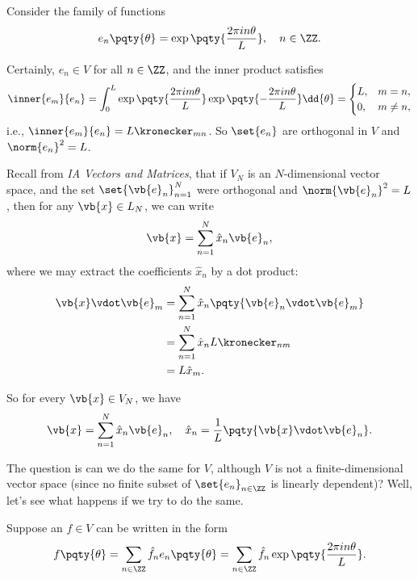 Consider the family of functions
\begin{equation}
    e_{n} \pqty{\theta} = \exp \pqty{\frac{2 \pi i n \theta}{L}}, \quad n \in \ZZ.
\end{equation}

Certainly, \(e_n \in V\) for all \(n \in \ZZ\), and the inner product satisfies
\begin{equation}
    \inner{e_m}{e_n} = \int_{0}^{L} \exp\pqty{\frac{2 \pi i m \theta}{L}} \exp\pqty{- \frac{2 \pi i n \theta}{L}} \dd{\theta} = \begin{cases}
        L, & m = n, \\
        0, & m \neq n,
    \end{cases}
\end{equation}
i.e., \(\inner{e_m}{e_n} = L \kronecker_{mn}\). So \(\set{e_n}\) are orthogonal in \(V\) and \(\norm{e_n}^2 = L\).

Recall from \textit{IA Vectors and Matrices}, that if \(V_N\) is an \(N\)-dimensional vector space, and the set \(\set{\vb{e}_n}_{n = 1}^{N}\) were orthogonal and \(\norm{\vb{e}_n}^2 = L\), then for any \(\vb{x} \in L_N\), we can write
\begin{equation}
    \vb{x} = \sum_{n = 1}^{N} \hat{x}_n \vb{e}_n,
\end{equation}
where we may extract the coefficients \(\hat{x}_n\) by a dot product:
\begin{subequations}
    \begin{align}
        \vb{x} \vdot \vb{e}_m &= \sum_{n = 1}^{N} \hat{x}_n \pqty{\vb{e}_n \vdot \vb{e}_m} \\
        &= \sum_{n = 1}^{N} \hat{x}_n L \kronecker_{nm} \\
        &= L \hat{x}_m.
    \end{align}
\end{subequations}

So for every \(\vb{x} \in V_N\), we have
\begin{equation}
    \vb{x} = \sum_{n = 1}^{N} \hat{x}_n \vb{e}_n, \quad \hat{x}_n = \frac{1}{L} \pqty{\vb{x} \vdot \vb{e}_n}.
\end{equation}

The question is can we do the same for \(V\), although \(V\) is not a finite-dimensional vector space (since no finite subset of \(\set{e_n}_{n \in \ZZ}\) is linearly dependent)? Well, let's see what happens if we try to do the same.

Suppose an \(f \in V\) can be written in the form
\begin{equation}
    f\pqty{\theta} = \sum_{n \in \ZZ} \hat{f}_n e_n\pqty{\theta} = \sum_{n \in \ZZ} \hat{f}_n \exp\pqty{\frac{2 \pi i n \theta}{L}}.
\end{equation}

